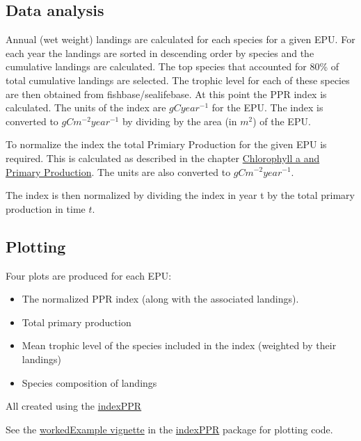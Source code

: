 \documentclass[
]{book}
\providecommand{\tightlist}{%
  \setlength{\itemsep}{0pt}\setlength{\parskip}{0pt}}
\begin{document}
\hypertarget{data-analysis-25}{%
\subsection{Data analysis}\label{data-analysis-25}}

Annual (wet weight) landings are calculated for each species for a given EPU. For each year the landings are sorted in descending order by species and the cumulative landings are calculated. The top species that accounted for 80\% of total cumulative landings are selected. The trophic level for each of these species are then obtained from fishbase/sealifebase. At this point the PPR index is calculated. The units of the index
are \(gCyear^{-1}\) for the EPU. The index is converted to \(gCm^{-2}year^{-1}\) by dividing by the area (in \(m^2\)) of the EPU.

To normalize the index the total Primiary Production for the given EPU is required. This is calculated as described in the chapter \href{https://noaa-edab.github.io/tech-doc/chl-pp.html}{Chlorophyll a and Primary Production}. The units are also converted to \(gCm^{-2}year^{-1}\).

The index is then normalized by dividing the index in year t by the total primary production in time \(t\).

\hypertarget{plotting-20}{%
\subsection{Plotting}\label{plotting-20}}

Four plots are produced for each EPU:

\begin{itemize}
\tightlist
\item
  The normalized PPR index (along with the associated landings).
\item
  Total primary production
\item
  Mean trophic level of the species included in the index (weighted by their landings)
\item
  Species composition of landings
\end{itemize}

All created using the \href{https://github.com/andybeet/indexPPR}{indexPPR}

See the \href{https://github.com/andybeet/indexPPR/tree/master/vignettes}{workedExample vignette} in the \href{https://github.com/andybeet/indexPPR/}{indexPPR} package for plotting code.
\end{document}

